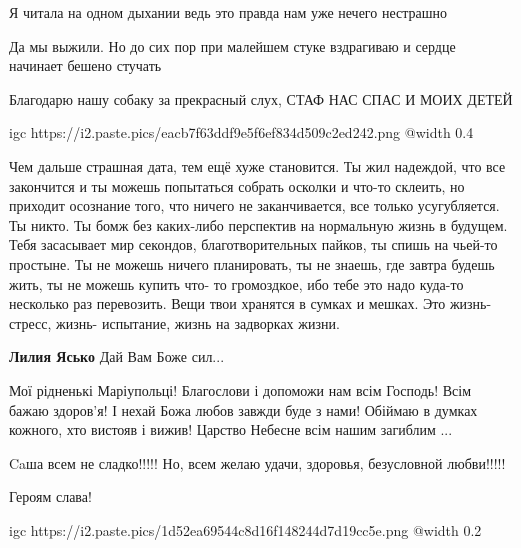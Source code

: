 
Я читала на одном дыхании ведь это правда нам уже нечего нестрашно


Да мы выжили. Но до сих пор при малейшем стуке вздрагиваю и сердце начинает бешено стучать


Благодарю нашу собаку за прекрасный слух, СТАФ НАС СПАС И МОИХ ДЕТЕЙ

\ifcmt
  igc https://i2.paste.pics/eacb7f63ddf9e5f6ef834d509c2ed242.png
	@width 0.4
\fi


Чем дальше страшная дата, тем ещё хуже становится. Ты жил надеждой, что все
закончится и ты можешь попытаться собрать осколки и что-то склеить, но
приходит осознание того, что ничего не заканчивается, все только усугубляется. Ты
никто. Ты бомж без каких-либо перспектив на нормальную жизнь в будущем. Тебя
засасывает мир секондов, благотворительных пайков, ты спишь на чьей-то простыне.
Ты не можешь ничего планировать, ты не знаешь, где завтра будешь жить, ты не
можешь купить что- то громоздкое, ибо тебе это надо куда-то несколько раз
перевозить. Вещи твои хранятся в сумках и мешках. Это жизнь-стресс, жизнь-
испытание, жизнь на задворках жизни.

\begin{itemize} %
\textbf{Лилия Ясько} Дай Вам Боже сил...


Мої рідненькі Маріупольці! Благослови і допоможи нам всім Господь! Всім бажаю
здоров'я! І нехай Божа любов завжди буде з нами! Обіймаю в думках кожного, хто
вистояв і вижив! Царство Небесне всім нашим загиблим ...

\end{itemize} %


Caша всем не сладко!!!!! Но, всем желаю удачи, здоровья, безусловной любви!!!!!


Героям слава!

\ifcmt
  igc https://i2.paste.pics/1d52ea69544c8d16f148244d7d19cc5e.png
	@width 0.2
\fi
